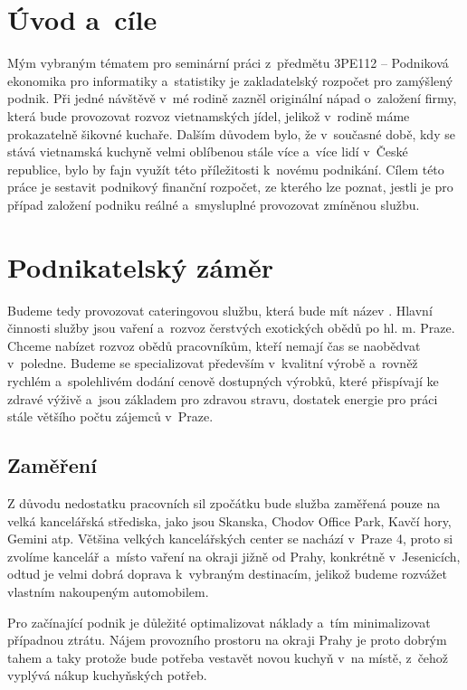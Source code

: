 \section*{Úvod a~cíle}
Mým vybraným tématem pro seminární práci z~předmětu 3PE112 -- Podniková ekonomika pro informatiky a~statistiky je zakladatelský rozpočet pro zamýšlený podnik. Při jedné návštěvě v~mé rodině zazněl originální nápad o~založení firmy, která bude provozovat rozvoz vietnamských jídel, jelikož v~rodině máme prokazatelně šikovné kuchaře. Dalším důvodem bylo, že v~současné době, kdy se stává vietnamská kuchyně velmi oblíbenou stále více a~více lidí v~České republice, bylo by fajn využít této příležitosti k~novému podnikání. Cílem této práce je sestavit podnikový finanční rozpočet, ze kterého lze poznat, jestli je pro případ založení podniku reálné a~smysluplné provozovat zmíněnou službu.





\section{Podnikatelský záměr}
Budeme tedy provozovat cateringovou službu, která bude mít název . Hlavní činnosti služby jsou vaření a~rozvoz čerstvých exotických obědů po hl. m. Praze. Chceme nabízet rozvoz obědů pracovníkům, kteří nemají čas se naobědvat v~poledne. Budeme se specializovat především v~kvalitní výrobě a~rovněž rychlém a~spolehlivém dodání cenově dostupných výrobků, které přispívají ke zdravé výživě a~jsou základem pro zdravou stravu, dostatek energie pro práci stále většího počtu zájemců v~Praze.

\subsection{Zaměření}
Z důvodu nedostatku pracovních sil zpočátku bude služba zaměřená pouze na velká kancelářská střediska, jako jsou Skanska, Chodov Office Park, Kavčí hory, Gemini atp. Většina velkých kancelářských center se nachází v~Praze 4, proto si zvolíme kancelář a~místo vaření na okraji jižně od Prahy, konkrétně v~Jesenicích, odtud je velmi dobrá doprava k~vybraným destinacím, jelikož budeme rozvážet vlastním nakoupeným automobilem. 

Pro začínající podnik je důležité optimalizovat náklady a~tím minimalizovat případnou ztrátu. Nájem provozního prostoru na okraji Prahy je proto dobrým tahem a taky protože bude potřeba vestavět novou kuchyň v~na místě, z~čehož vyplývá nákup kuchyňských potřeb.

